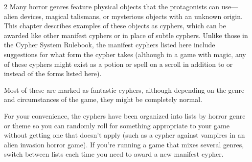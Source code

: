 \begin{multicols}{2}
Many horror genres feature physical objects that the protagonists can use—alien devices, magical talismans, or mysterious objects with an unknown origin. This chapter describes examples of these objects as cyphers, which can be awarded like other manifest cyphers or in place of subtle cyphers. Unlike those in the Cypher System Rulebook, the manifest cyphers listed here include suggestions for what form the cypher takes (although in a game with magic, any of these cyphers might exist as a potion or spell on a scroll in addition to or instead of the forms listed here).

Most of these are marked as fantastic cyphers, although depending on the genre and circumstances of the game, they might be completely normal.

For your convenience, the cyphers have been organized into lists by horror genre or theme so you can randomly roll for something appropriate to your game without getting one that doesn’t apply (such as a cypher against vampires in an alien invasion horror game). If you’re running a game that mixes several genres, switch between lists each time you need to award a new manifest cypher.
  
\end{multicols}

